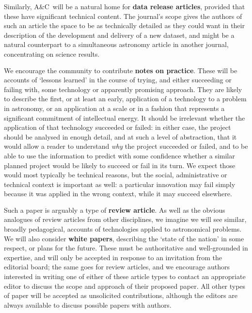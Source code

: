 \documentclass[11pt,twoside]{article}
\newcommand{\ac}{A\&C}
\begin{document}
Similarly,  \ac\ will be a natural home for
\textbf{data release articles}, provided that these have significant technical content.  
The journal's scope gives the authors of such an
article the space to be as technically detailed as they
could want in their description of the development and delivery of a
new dataset, and might be a natural counterpart to a simultaneous
astronomy article in another journal,  concentrating on 
science results.

We encourage the community to contribute \textbf{notes on practice}.  These
will be accounts of `lessons learned' in the course of trying, and either
succeeding or failing with, some technology or apparently promising
approach. They are likely to describe the first,
or at least an early, application of a technology to a problem in
astronomy, or an application at a scale or in a fashion that represents
a significant commitment of intellectual energy.  It should
be irrelevant whether the application of that technology succeeded or
failed: in either case, the project should be analysed in enough
detail, and at such a level of abstraction, that it would allow a reader to
understand \emph{why} the project succeeded or failed, and to be able
to use the information to predict with some confidence whether a
similar planned project would be likely to succeed
or fail in its turn. We expect those would most typically be technical
reasons, but the social, administrative or technical context is 
important as well: a particular innovation may fail simply because it was
applied in the wrong context, while it may succeed elsewhere.

Such a paper is arguably a type of \textbf{review article}.  As well as the
obvious analogues of review articles from other disciplines, we
imagine we will see similar, broadly pedagogical, accounts of
technologies applied to astronomical problems.  We will also consider 
\textbf{white papers}, describing the
`state of the nation' in some respect, or plans for the future.  These must be authoritative and well-grounded in
expertise, and will only be accepted in response to an invitation from
the editorial board; the same goes for review articles, and we encourage authors
interested in writing one of either of these article types to contact an appropriate
editor to discuss the scope and approach of their proposed paper. All other types
of paper will be accepted as unsolicited contributions, although the editors are
always available to discuss possible papers with authors. 
\end{document}

